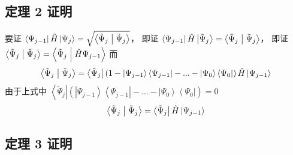 \subsection{定理 2 证明}
要证 $\left\langle {{\Psi _{j - 1}}} \right|\hat H\left| {{\Psi _j}} \right\rangle  = \sqrt {\left\langle {{{{\tilde \Psi }_j}}}
 \mathrel{\left | {\vphantom {{{{\tilde \Psi }_j}} {{{\tilde \Psi }_j}}}}
 \right. \kern-\nulldelimiterspace}
 {{{{\tilde \Psi }_j}}} \right\rangle }$， 即证 $\left\langle {{\Psi _{j - 1}}} \right|\hat H\left| {{{\tilde \Psi }_j}} \right\rangle  = \left\langle {{{{\tilde \Psi }_j}}}
 \mathrel{\left | {\vphantom {{{{\tilde \Psi }_j}} {{{\tilde \Psi }_j}}}}
 \right. \kern-\nulldelimiterspace}
 {{{{\tilde \Psi }_j}}} \right\rangle$， 即证 $\left\langle {{{{\tilde \Psi }_j}}}
 \mathrel{\left | {\vphantom {{{{\tilde \Psi }_j}} {{{\tilde \Psi }_j}}}}
 \right. \kern-\nulldelimiterspace}
 {{{{\tilde \Psi }_j}}} \right\rangle  = \left\langle {{{{\tilde \Psi }_j}}}
 \mathrel{\left | {\vphantom {{{{\tilde \Psi }_j}} {\hat H{\Psi _{j - 1}}}}}
 \right. \kern-\nulldelimiterspace}
 {{\hat H{\Psi _{j - 1}}}} \right\rangle $
而
\begin{equation}
\left\langle {{{{\tilde \Psi }_j}}}
 \mathrel{\left | {\vphantom {{{{\tilde \Psi }_j}} {{{\tilde \Psi }_j}}}}
 \right. \kern-\nulldelimiterspace}
 {{{{\tilde \Psi }_j}}} \right\rangle  = \left\langle {{{\tilde \Psi }_j}} \right|\left( {1 - \left| {{\Psi _{j - 1}}} \right\rangle \left\langle {{\Psi _{j - 1}}} \right| - ... - \left| {{\Psi _0}} \right\rangle \left\langle {{\Psi _0}} \right|} \right)\hat H\left| {{\Psi _{j - 1}}} \right\rangle 
\end{equation}
由于上式中  $\left\langle {{{\tilde \Psi }_j}} \right|\left( {\left| {{\Psi _{j - 1}}} \right\rangle \left\langle {{\Psi _{j - 1}}} \right| - ... - \left| {{\Psi _0}} \right\rangle \left\langle {{\Psi _0}} \right|} \right) = 0$
\begin{equation}
 \left\langle {{{{\tilde \Psi }_j}}}
 \mathrel{\left | {\vphantom {{{{\tilde \Psi }_j}} {{{\tilde \Psi }_j}}}}
 \right. \kern-\nulldelimiterspace}
 {{{{\tilde \Psi }_j}}} \right\rangle  = \left\langle {{{\tilde \Psi }_j}} \right|\hat H\left| {{\Psi _{j - 1}}} \right\rangle
\end{equation}

\subsection{定理 3 证明}

